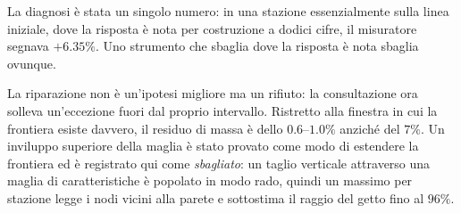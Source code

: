 La diagnosi è stata un singolo numero: in una stazione essenzialmente
sulla linea iniziale, dove la risposta è nota per costruzione a
dodici cifre, il misuratore segnava $+6.35\%$. Uno strumento che
sbaglia dove la risposta è nota sbaglia ovunque.

La riparazione non è un'ipotesi migliore ma un rifiuto: la
consultazione ora solleva un'eccezione fuori dal proprio intervallo.
Ristretto alla finestra in cui la frontiera esiste davvero, il residuo
di massa è dello $0.6$--$1.0\%$ anziché del $7\%$. Un inviluppo
superiore della maglia è stato provato come modo di estendere la
frontiera ed è registrato qui come \emph{sbagliato}: un taglio
verticale attraverso una maglia di caratteristiche è popolato in modo
rado, quindi un massimo per stazione legge i nodi vicini alla parete e
sottostima il raggio del getto fino al $96\%$.

